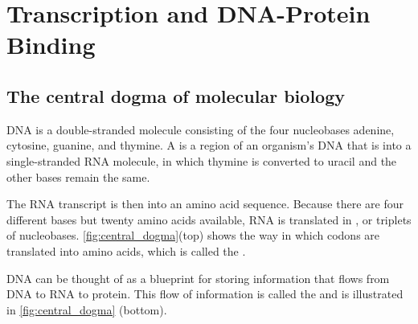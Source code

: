 \FloatBarrier
{}

\section{Transcription and DNA-Protein Binding}
\label{sec:transcription_and_dna-protein_binding}

\subsection{The central dogma of molecular biology}

DNA is a double-stranded molecule consisting of the four nucleobases adenine, cytosine, guanine, and thymine. A  is a region of an organism's DNA that is  into a single-stranded RNA molecule, in which thymine is converted to uracil and the other bases remain the same.

The RNA transcript is then  into an amino acid sequence. Because there are four different bases but twenty amino acids available, RNA is translated in , or triplets of nucleobases. \autoref{fig:central_dogma}(top) shows the way in which codons are translated into amino acids, which is called the .

DNA can be thought of as a blueprint for storing information that flows from DNA to RNA to protein. This flow of information is called the  and is illustrated in \autoref{fig:central_dogma} (bottom).\\

